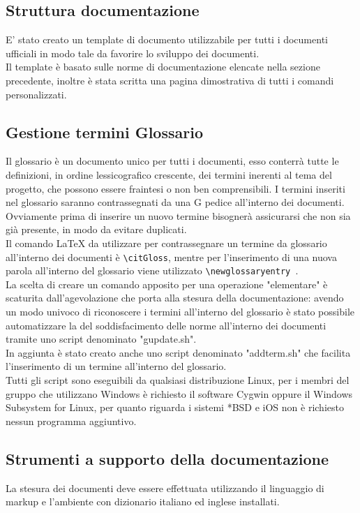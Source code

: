 \documentclass[NormeDiProgetto.tex]{subfiles}
\begin{document}
	\subsection{Struttura documentazione}
	E' stato creato un template di documento utilizzabile per tutti i documenti ufficiali in modo tale da favorire lo sviluppo dei documenti.\\
	Il template è basato sulle norme di documentazione elencate nella sezione precedente, inoltre è stata scritta una pagina dimostrativa di tutti i comandi personalizzati.
	
	\subsection{Gestione termini Glossario}
	Il glossario è un documento unico per tutti i documenti, esso conterrà tutte le definizioni, in ordine lessicografico crescente, dei termini inerenti al tema del progetto, che possono essere fraintesi o non ben comprensibili. I termini inseriti nel glossario saranno contrassegnati da una G pedice all'interno dei documenti.\\
	Ovviamente prima di inserire un nuovo termine bisognerà assicurarsi che non sia già presente, in modo da evitare duplicati. \\
	Il comando \LaTeX{} da utilizzare per contrassegnare un termine da glossario all'interno dei documenti è \texttt{\textbackslash{}citGloss}, mentre per l'inserimento di una nuova parola all'interno del glossario viene utilizzato \texttt{\textbackslash{}newglossaryentry }.\\
	La scelta di creare un comando apposito per una operazione "elementare" è scaturita dall'agevolazione che porta alla stesura della documentazione: avendo un modo univoco di riconoscere i termini all'interno del glossario è stato possibile automatizzare la  del soddisfacimento delle norme all'interno dei documenti tramite uno script denominato "gupdate.sh".\\
	In aggiunta è stato creato anche uno script denominato "addterm.sh" che facilita l'inserimento di un termine all'interno del glossario.\\
	Tutti gli script sono eseguibili da qualsiasi distribuzione Linux, per i membri del gruppo che utilizzano Windows è richiesto il software Cygwin oppure il Windows Subsystem for Linux, per quanto riguarda i sistemi *BSD e iOS non è richiesto nessun programma aggiuntivo.
	
	\subsection{Strumenti a supporto della documentazione}
	La stesura dei documenti deve essere effettuata utilizzando il linguaggio di markup   e l'ambiente  con dizionario italiano ed inglese installati.
	
\end{document}
